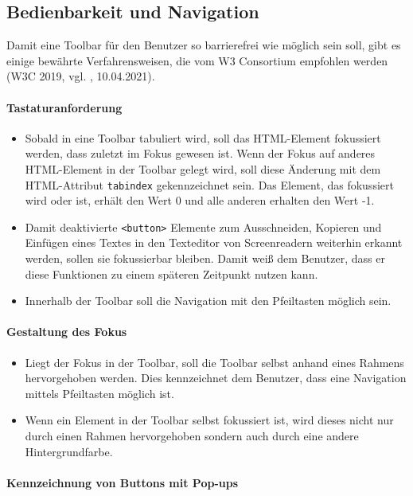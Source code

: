\subsection{Bedienbarkeit und Navigation}
Damit eine Toolbar für den Benutzer so barrierefrei wie möglich sein soll, gibt es einige bewährte Verfahrensweisen, 
die vom W3 Consortium empfohlen werden (W3C 2019, vgl. \cite{accessible_toolbar_2020}, 10.04.2021).

\paragraph{Tastaturanforderung}

\begin{itemize}
	\item Sobald in eine Toolbar tabuliert wird, soll das HTML-Element fokussiert werden, dass zuletzt im Fokus 
		gewesen ist. Wenn der Fokus auf anderes HTML-Element in der Toolbar gelegt wird, soll diese 
		Änderung mit dem HTML-Attribut \texttt{tabindex} gekennzeichnet sein. Das Element, das fokussiert wird 	
		oder ist, erhält den Wert 0 und alle anderen erhalten den Wert -1.
	\item Damit deaktivierte \texttt{<button>} Elemente zum Ausschneiden, Kopieren und Einfügen eines Textes in 
		den Texteditor von Screenreadern weiterhin erkannt werden, sollen sie fokussierbar bleiben. Damit weiß
		dem Benutzer, dass er diese Funktionen zu einem späteren Zeitpunkt nutzen kann.
	\item Innerhalb der Toolbar soll die Navigation mit den Pfeiltasten möglich sein. 
\end{itemize}

\paragraph{Gestaltung des Fokus}

\begin{itemize}
	\item Liegt der Fokus in der Toolbar, soll die Toolbar selbst anhand eines Rahmens hervorgehoben werden. Dies
		kennzeichnet dem Benutzer, dass eine Navigation mittels Pfeiltasten möglich ist.
	\item Wenn ein Element in der Toolbar selbst fokussiert ist, wird dieses nicht nur durch einen Rahmen 	
		hervorgehoben sondern auch durch eine andere Hintergrundfarbe.
\end{itemize}

\paragraph{Kennzeichnung von Buttons mit Pop-ups}

